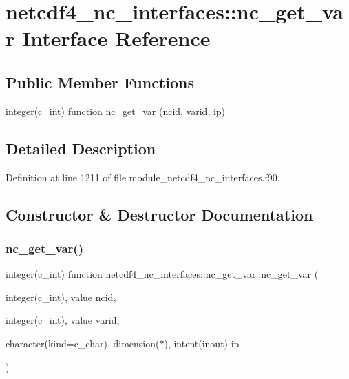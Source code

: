 \hypertarget{interfacenetcdf4__nc__interfaces_1_1nc__get__var}{}\section{netcdf4\+\_\+nc\+\_\+interfaces\+:\+:nc\+\_\+get\+\_\+var Interface Reference}
\label{interfacenetcdf4__nc__interfaces_1_1nc__get__var}
\subsection*{Public Member Functions}
\begin{DoxyCompactItemize}
\item 
integer(c\+\_\+int) function \hyperlink{interfacenetcdf4__nc__interfaces_1_1nc__get__var_ae29ca5813b8610bd0111b350eedfe320}{nc\+\_\+get\+\_\+var} (ncid, varid, ip)
\end{DoxyCompactItemize}


\subsection{Detailed Description}


Definition at line 1211 of file module\+\_\+netcdf4\+\_\+nc\+\_\+interfaces.\+f90.



\subsection{Constructor \& Destructor Documentation}
\mbox{\label{interfacenetcdf4__nc__interfaces_1_1nc__get__var_ae29ca5813b8610bd0111b350eedfe320}} 
\subsubsection{\texorpdfstring{nc\+\_\+get\+\_\+var()}{nc\_get\_var()}}
{\footnotesize\ttfamily integer(c\+\_\+int) function netcdf4\+\_\+nc\+\_\+interfaces\+::nc\+\_\+get\+\_\+var\+::nc\+\_\+get\+\_\+var (\begin{DoxyParamCaption}\item[{integer(c\+\_\+int), value}]{ncid,  }\item[{integer(c\+\_\+int), value}]{varid,  }\item[{character(kind=c\+\_\+char), dimension($\ast$), intent(inout)}]{ip }\end{DoxyParamCaption})}



